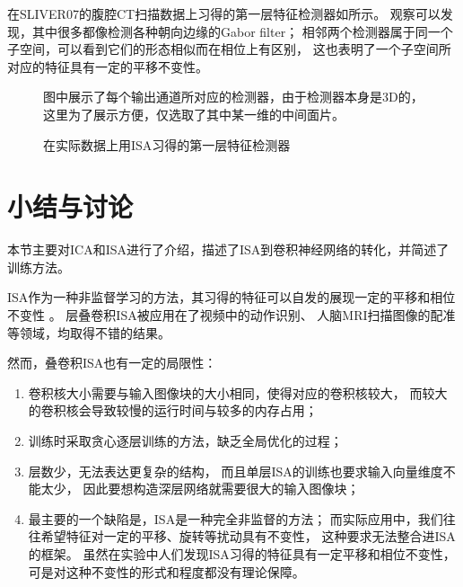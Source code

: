在SLIVER07的腹腔CT扫描数据上习得的第一层特征检测器如所示。
观察可以发现，其中很多都像检测各种朝向边缘的Gabor filter；
相邻两个检测器属于同一个子空间，可以看到它们的形态相似而在相位上有区别，
这也表明了一个子空间所对应的特征具有一定的平移不变性。

\begin{figure}[h!]
    {
        \caption{在实际数据上用ISA习得的第一层特征检测器}
        \label{fig:isa:filter}
    }
    \footnotesize
    图中展示了每个输出通道所对应的检测器，由于检测器本身是3D的，
    这里为了展示方便，仅选取了其中某一维的中间面片。
\end{figure}


\section{小结与讨论\label{sec:ISA:discuss}}
本节主要对ICA和ISA进行了介绍，描述了ISA到卷积神经网络的转化，并简述了训练方法。

ISA作为一种非监督学习的方法，其习得的特征可以自发的展现一定的平移和相位不变性
\cite{hyvarinen2000emergence}。
层叠卷积ISA被应用在了视频中的动作识别\cite{le2011learning}、
人脑MRI扫描图像的配准\cite{wu2013unsupervised}等领域，均取得不错的结果。

然而，叠卷积ISA也有一定的局限性：
\begin{enumerate}
    \item 卷积核大小需要与输入图像块的大小相同，使得对应的卷积核较大，
        而较大的卷积核会导致较慢的运行时间与较多的内存占用；
    \item 训练时采取贪心逐层训练的方法，缺乏全局优化的过程；
    \item 层数少，无法表达更复杂的结构，
        而且单层ISA的训练也要求输入向量维度不能太少，
        因此要想构造深层网络就需要很大的输入图像块；
    \item 最主要的一个缺陷是，ISA是一种完全非监督的方法；
        而实际应用中，我们往往希望特征对一定的平移、旋转等扰动具有不变性，
        这种要求无法整合进ISA的框架。
        虽然在实验中人们发现ISA习得的特征具有一定平移和相位不变性，
        可是对这种不变性的形式和程度都没有理论保障。
\end{enumerate}

